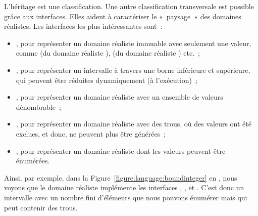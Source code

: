L'héritage est une classification. Une autre classification {\strong
transversale} est possible grâce aux {\strong interfaces}. Elles aident à
caractériser le «~paysage~» des domaines réalistes. Les interfaces les plus
intéressantes sont~:

\begin{itemize}

\item {}, pour représenter un domaine réaliste immuable avec
seulement une valeur, comme  (du domaine réaliste ),
 (du domaine réaliste ) etc.~;

\item {}, pour représenter un intervalle à travers une borne
inférieure et supérieure, qui peuvent être réduites dynamiquement (à
l'exécution)~;

\item {}, pour représenter un domaine réaliste avec un ensemble de
valeurs dénombrable~;

\item {}, pour représenter un domaine réaliste avec des trous, \ie
où des valeurs ont été exclues, et donc, ne peuvent plus être générées~;

\item {}, pour représenter un domaine réaliste dont les valeurs
peuvent être énumérées.

\end{itemize}

Ainsi, par exemple, dans la Figure~\ref{figure:language:boundinteger} en
, nous voyons que le domaine réaliste  implémente
les interfaces , ,  et
. C'est donc un intervalle avec un nombre fini d'éléments que
nous pouvons énumérer mais qui peut contenir des trous.
